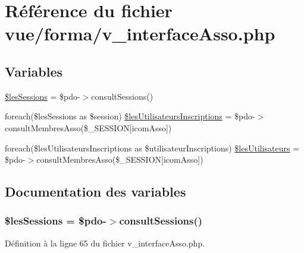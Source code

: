 \hypertarget{v__interface_asso_8php}{}\section{Référence du fichier vue/forma/v\+\_\+interface\+Asso.php}
\label{v__interface_asso_8php}
\subsection*{Variables}
\begin{DoxyCompactItemize}
\item 
\hyperlink{v__interface_asso_8php_a70ae64ee30514f1283a02326cabe6413}{\$les\+Sessions} = \$pdo-\/$>$consult\+Sessions()
\item 
foreach(\$les\+Sessions as \$session) \hyperlink{v__interface_asso_8php_a7d7df1b17930a8f01bcdffe9d2d6d882}{\$les\+Utilisateurs\+Inscriptions} = \$pdo-\/$>$consult\+Membres\+Asso(\$\+\_\+\+S\+E\+S\+S\+I\+ON\mbox{[}\textquotesingle{}icom\+Asso\textquotesingle{}\mbox{]})
\item 
foreach(\$les\+Utilisateurs\+Inscriptions as \$utilisateur\+Inscriptions) \hyperlink{v__interface_asso_8php_a58ef35582b849c117a143a4d08f602c5}{\$les\+Utilisateurs} = \$pdo-\/$>$consult\+Membres\+Asso(\$\+\_\+\+S\+E\+S\+S\+I\+ON\mbox{[}\textquotesingle{}icom\+Asso\textquotesingle{}\mbox{]})
\end{DoxyCompactItemize}


\subsection{Documentation des variables}
\subsubsection[{\texorpdfstring{\$les\+Sessions}{$lesSessions}}]{\setlength{\rightskip}{0pt plus 5cm}\$les\+Sessions = \$pdo-\/$>$consult\+Sessions()}\hypertarget{v__interface_asso_8php_a70ae64ee30514f1283a02326cabe6413}{}\label{v__interface_asso_8php_a70ae64ee30514f1283a02326cabe6413}


Définition à la ligne 65 du fichier v\+\_\+interface\+Asso.\+php.


